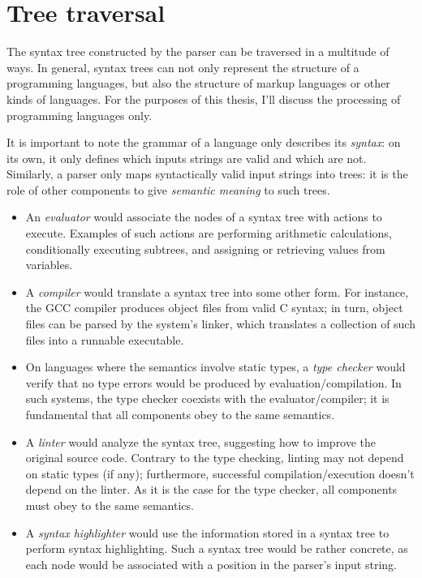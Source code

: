 \documentclass[11pt, american, draft]{PhdThesis}
\begin{document}
  \chapter{Tree traversal}

  The syntax tree constructed by the parser can be traversed in a multitude of ways. In general,
  syntax trees can not only represent the structure of a programming languages, but also the
  structure of markup languages or other kinds of languages. For the purposes of this thesis, I'll
  discuss the processing of programming languages only.

  It is important to note the grammar of a language only describes its \emph{syntax}: on its own,
  it only defines which inputs strings are valid and which are not. Similarly, a parser only
  maps syntactically valid input strings into trees: it is the role of other components to give
  \emph{semantic meaning} to such trees.

  \begin{itemize}[noitemsep,topsep=0pt]
    \item An \emph{evaluator} would associate the nodes of a syntax tree with actions to execute.
    Examples of such actions are performing arithmetic calculations, conditionally executing
    subtrees, and assigning or retrieving values from variables.

    \item A \emph{compiler} would translate a syntax tree into some other form. For instance, the
    GCC compiler produces object files from valid C syntax; in turn, object files can be parsed by
    the system's linker, which translates a collection of such files into a runnable executable.

    \item On languages where the semantics involve static types, a \emph{type checker} would verify
    that no type errors would be produced by evaluation/compilation. In such systems, the type
    checker coexists with the evaluator/compiler; it is fundamental that all components obey to the
    same semantics.

    \item A \emph{linter} would analyze the syntax tree, suggesting how to improve the original
    source code. Contrary to the type checking, linting may not depend on static types (if any);
    furthermore, successful compilation/execution doesn't depend on the linter. As it is the case
    for the type checker, all components must obey to the same semantics.

    \item A \emph{syntax highlighter} would use the information stored in a syntax tree to perform
    syntax highlighting. Such a syntax tree would be rather concrete, as each node would be
    associated with a position in the parser's input string.
  \end{itemize}
\end{document}
